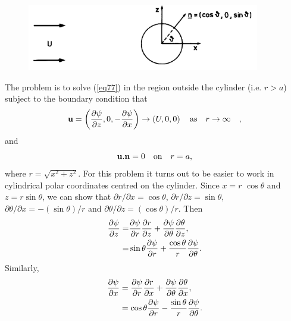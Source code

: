 \documentclass[twoside,a4paper,11pt]{report}
\begin{document}
\begin{figure}[htbp]
\centerline{\includegraphics[width=4in]{Section73.pdf}}
\label{fig3}
\end{figure}

The problem is to solve (\ref{eq77}) in the region outside the cylinder (i.e. $ r 
> a$) subject to the boundary condition that
\begin{equation}
\label{eq78}
{{\bf u}}=\left( {\frac{\partial \psi }{\partial z},0,-\frac{\partial 
\psi }{\partial x}} \right)\to \left( {U,0,0} \right)\quad\hbox{as}\quad r\to \infty 
\quad ,
\end{equation}
and 
\begin{equation} {{\bf u}}. {{\bf n}}=0\quad \hbox{on}\quad r=a, \label{eq710} \end{equation}
where $r=\sqrt {x^2+z^2} $. For this problem it turns out to be easier to 
work in cylindrical polar coordinates centred on the cylinder. Since $x = r$ 
$\cos \theta $ and $z = r \sin \theta $, we can show that $\partial 
r/\partial x = \cos\theta $, $\partial r/\partial z = \sin\theta $, 
$\partial \theta /\partial x = -(\sin \theta )/r$ and $\partial 
\theta /\partial z = (\cos \theta )/r$.
Then 
\begin{align} \frac{\partial \psi }{\partial z}= & \frac{\partial \psi }{\partial 
r}\frac{\partial r}{\partial z}+\frac{\partial \psi }{\partial \theta 
}\frac{\partial \theta }{\partial z}, \notag \\
= & \sin \theta \frac{\partial \psi 
}{\partial r}+\frac{\cos \theta }{r}\frac{\partial \psi }{\partial \theta }. \label{eq711} \end{align}
Similarly, 
\begin{align} \frac{\partial \psi }{\partial x} & =\frac{\partial \psi }{\partial 
r}\frac{\partial r}{\partial x}+\frac{\partial \psi }{\partial \theta 
}\frac{\partial \theta }{\partial x}, \notag \\
& =\cos \theta 
\frac{\partial \psi }{\partial r}-\frac{\sin \theta }{r}\frac{\partial \psi 
}{\partial \theta }. \label{eq712} \end{align}
\end{document}
